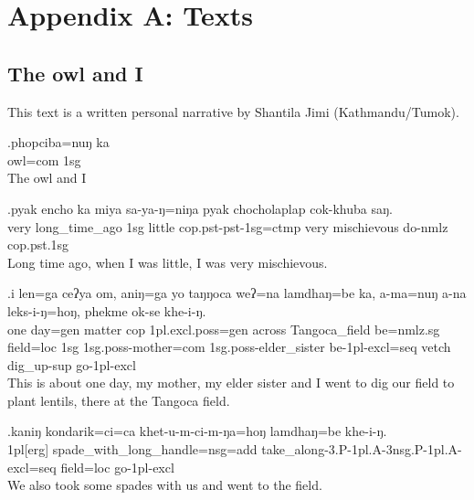 \chapter*{Appendix A: Texts}\label{app-texts}

\section*{The owl and I}

\noindent This text is a written personal narrative by Shantila Jimi (Kathmandu/Tumok). 

\setcounter{ExNo}{0}

\exg.phopciba=nuŋ   ka\\
 owl{\sc =com} {\sc 1sg}\\
The owl and I

\exg.pyak encho         ka  miya   sa-ya-ŋ=niŋa                pyak chocholaplap cok-khuba      saŋ.\\
 very long\_time\_ago {\sc 1sg} little {\sc cop.pst-pst-1sg=ctmp} very mischievous  do{\sc -nmlz} {\sc cop.pst.1sg}\\
Long time ago, when I was little, I was very mischievous.

\exg.i    len=ga    ceʔya om,  aniŋ=ga  yo taŋŋoca weʔ=na lamdhaŋ=be    ka,  a-ma=nuŋ  a-na leks-i-ŋ=hoŋ, phekme ok-se khe-i-ŋ.\\
 one day=gen matter {\sc cop} {\sc 1pl.excl.poss=gen} across  Tangoca\_field   be{\sc =nmlz.sg} field{\sc =loc} {\sc 1sg} {\sc 1sg.poss-}mother{\sc =com}  {\sc 1sg.poss-}elder\_sister be{\sc -1pl-excl=seq}  vetch  dig\_up{\sc -sup} go{\sc -1pl-excl}\\
This is about one day, my mother, my elder sister and I went to dig our field to plant lentils, there at the Tangoca field.

\exg.kaniŋ   kondarik=ci=ca                         khet-u-m-ci-m-ŋa=hoŋ                                 lamdhaŋ=be    khe-i-ŋ.\\
 {\sc 1pl[erg]} spade\_with\_long\_handle{\sc =nsg=add} take\_along{\sc -3.P-1pl.A-3nsg.P-1pl.A-excl=seq}  field{\sc  =loc} go{\sc -1pl-excl}\\
We also took some spades with us and went to the field.

